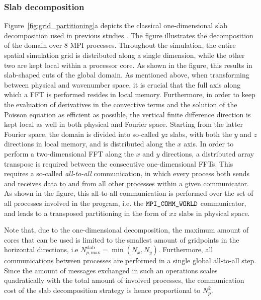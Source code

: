 \subsubsection{Slab decomposition} 
Figure~\ref{fig:grid_partitioning}a depicts the classical one-dimensional slab decomposition used in previous studies \cite{delport2009constrained, calaf2010large, goit2015optimal}. The figure illustrates the decomposition of the domain over 8 MPI processes. Throughout the simulation, the entire spatial simulation grid is distributed along a single dimension, while the other two are kept local within a processor core. As shown in the figure, this results in slab-shaped cuts of the global domain. As mentioned above, when transforming between physical and wavenumber space, it is crucial that the full axis along which a FFT is performed resides in local memory. Furthermore, in order to keep the evaluation of derivatives in the convective terms and the solution of the Poisson equation as efficient as possible, the vertical finite difference direction is kept local as well in both physical and Fourier space. Starting from the latter Fourier space, the domain is divided into so-called $yz$ slabs, with both the $y$ and $z$ directions in local memory, and is distributed along the $x$ axis.  In order to perform a two-dimensional FFT along the $x$ and $y$ directions, a distributed array transpose is required between the consecutive one-dimensional FFTs. This requires a so-called \emph{all-to-all} communication, in which every process both sends and receives data to and from all other processes within a given communicator. As shown in the figure, this all-to-all communication is performed over the set of all processes involved in the program, i.e. the $\verb|MPI_COMM_WORLD|$ communicator, and leads to a transposed partitioning in the form of $xz$ slabs in physical space. 

Note that, due to the one-dimensional decomposition, the maximum amount of cores that can be used is limited to the smallest amount of gridpoints in the horizontal directions, i.e $N_{p,\text{max}}^{\text{slab}} = \min(N_x, N_y)$. Furthermore, all communications between processes are performed in a single global all-to-all step. Since the amount of messages exchanged in such an operations scales quadratically with the total amount of involved processes, the communication cost of the slab decomposition strategy is hence proportional to $N_p^2$.

